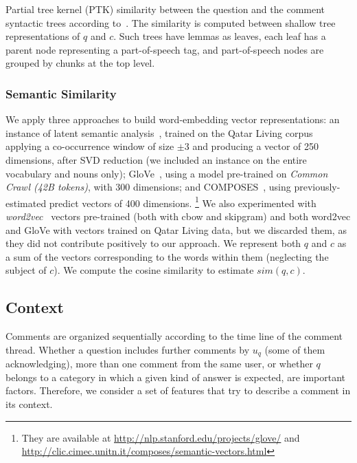 Partial tree kernel (PTK) similarity between the question and the comment 
syntactic trees according to~\cite{Moschitti:2006}. The similarity is computed 
between shallow tree  representations of $q$ and $c$. Such trees have lemmas as 
leaves, each leaf has a parent node representing a part-of-speech tag, and 
part-of-speech nodes are grouped by chunks at the top level.

\subsubsection{Semantic Similarity}
\label{sub:semantic}

We apply three approaches to build  word-embedding vector representations:
\Ni an instance of latent semantic analysis~\cite{croce-previtali:2010:GEMS}, 
trained on the Qatar Living corpus applying a co-occurrence window of size 
$\pm3$ and producing a vector of 250 dimensions, after SVD reduction (we 
included an instance on the entire vocabulary and nouns only); 
\Nii GloVe~\cite{Pennington:2014}, using a model pre-trained on \textit{Common 
Crawl (42B tokens)}, with 300 dimensions; and 
\Niii COMPOSES~\cite{Baroni:2014}, using previously-estimated predict vectors of 
400 dimensions.%
\footnote{They are available at \url{http://nlp.stanford.edu/projects/glove/} 
and \url{http://clic.cimec.unitn.it/composes/semantic-vectors.html}}
We also experimented with \textit{word2vec}~\cite{Mikolov:2013} vectors 
pre-trained (both with cbow and skipgram) and both word2vec and GloVe with 
vectors trained on Qatar Living data, but we discarded them, as they did not 
contribute positively to our approach. We represent both $q$ and $c$ as 
a sum of the vectors corresponding to the words within them (neglecting the 
subject of $c$). We compute the cosine similarity to estimate $sim(q,c)$. 

\subsection{Context}
\label{ssub:context}

Comments are organized sequentially according to the time line of the comment 
thread. Whether a question includes further comments by $u_q$ (some of them 
acknowledging), more than one comment from the same user, or whether $q$ belongs 
to a category in which a given kind of answer is expected, are important 
factors. Therefore, we consider a set of features that try to describe a 
comment in its context.   

